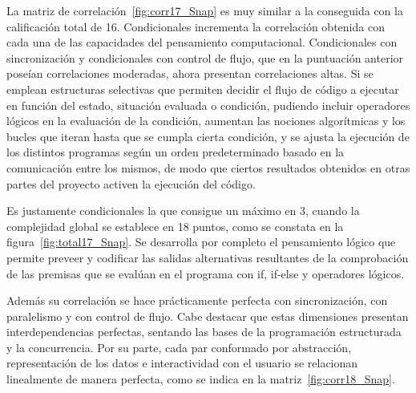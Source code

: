 \documentclass[a4paper, 12pt]{book}
\begin{document}
La matriz de correlación~\ref{fig:corr17_Snap} es muy similar a la conseguida con la calificación total de 16. Condicionales incrementa la correlación obtenida con cada una de las capacidades del pensamiento computacional. Condicionales con sincronización y condicionales con control de flujo, que en la puntuación anterior poseían correlaciones moderadas, ahora presentan correlaciones altas. Si se emplean estructuras selectivas que permiten decidir el flujo de código a ejecutar en función del estado, situación evaluada o condición, pudiendo incluir operadores lógicos en la evaluación de la condición, aumentan las nociones algorítmicas y los bucles que iteran hasta que se cumpla cierta condición, y se ajusta la ejecución de los distintos programas según un orden predeterminado basado en la comunicación entre los mismos, de modo que ciertos resultados obtenidos en otras partes del proyecto activen la ejecución del código. 

Es justamente condicionales la que consigue un máximo en 3, cuando la complejidad global se establece en 18 puntos, como se constata en la figura~\ref{fig:total17_Snap}. Se desarrolla por completo el pensamiento lógico que permite preveer y codificar las salidas alternativas resultantes de la comprobación de las premisas que se evalúan en el programa con if, if-else y operadores lógicos. 

Además su correlación se hace prácticamente perfecta con sincronización, con paralelismo y con control de flujo. Cabe destacar que estas dimensiones presentan interdependencias perfectas, sentando las bases de la programación estructurada y la concurrencia. Por su parte, cada par conformado por abstracción, representación de los datos e interactividad con el usuario se relacionan linealmente de manera perfecta, como se indica en la matriz~\ref{fig:corr18_Snap}.
\end{document}
